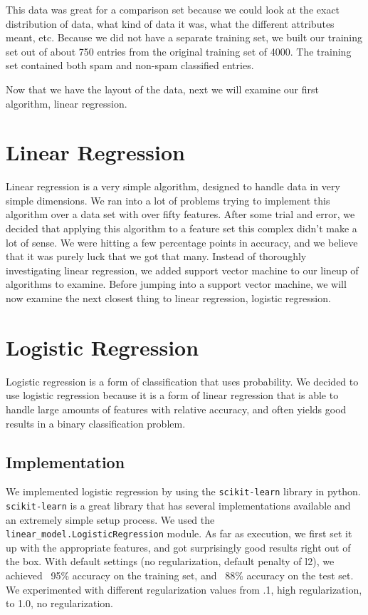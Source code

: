 \documentclass[10pt,letterpaper,onecolumn,draftclsnofoot]{IEEEtran}
\begin{document}
This data was great for a comparison set because we could look at the exact distribution
of data, what kind of data it was, what the different attributes meant, etc. Because we
did not have a separate training set, we built our training set out of about 750 entries
from the original training set of 4000. The training set contained both spam and non-spam
classified entries.

Now that we have the layout of the data, next we will examine our first algorithm,
linear regression.

\section{Linear Regression}
Linear regression is a very simple algorithm, designed to handle data in very simple
dimensions. We ran into a lot of problems trying to implement this algorithm over
a data set with over fifty features. After some trial and error, we decided that
applying this algorithm to a feature set this complex didn't make a lot of sense.
We were hitting a few percentage points in accuracy, and we believe that it was
purely luck that we got that many. Instead of thoroughly investigating linear regression,
we added support vector machine to our lineup of algorithms to examine. Before
jumping into a support vector machine, we will now examine the next closest thing
to linear regression, logistic regression.

\section{Logistic Regression}
Logistic regression is a form of classification that uses probability. We decided
to use logistic regression because it is a form of linear regression that is able
to handle large amounts of features with relative accuracy, and often yields good
results in a binary classification problem. 
	\subsection{Implementation}
	We implemented logistic regression by using the \texttt{scikit-learn} library
	in python. \texttt{scikit-learn} is a great library that has several implementations
	available and an extremely simple setup process. We used the \texttt{linear\_model.LogisticRegression}
	module.
	As far as execution, we first set it up with the appropriate features, and 
	got surprisingly good results right out of the box. With default settings 
	(no regularization, default penalty of l2), we achieved ~95\% accuracy on the
	 training set, and ~88\% accuracy on the test set. We experimented with different
	 regularization values from .1, high regularization, to 1.0, no regularization.
	 
\end{document}
